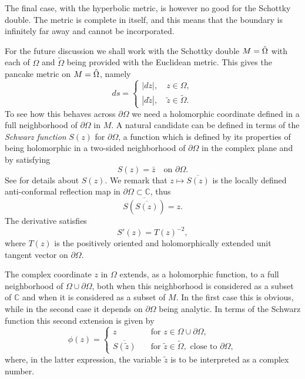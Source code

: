 \documentclass[reqno,12pt]{article}
\theoremstyle{plain}
\theoremstyle{definition}
\numberwithin{equation}{section}
\numberwithin{figure}{section}
\def\C{{\mathbb C}}
\begin{document}
The final case, with the hyperbolic metric, is 
however no good for the Schottky double. The metric is complete in itself, and this means that the boundary is
infinitely far away and cannot be incorporated.

For the future discussion we shall work with the Schottky double 
$M=\Hat{\Omega}$ with each of $\Omega$  and $\tilde{\Omega}$
being provided with the Euclidean metric. This gives the pancake metric on $M=\Hat{\Omega}$, namely
\begin{equation}\label{metricM}
ds=
\begin{cases}
|dz|, \quad z\in \Omega,\\
|d\tilde{z}|, \quad \tilde{z}\in \tilde{\Omega}.
\end{cases}
\end{equation}
To see how this behaves across
$\partial \Omega$ we need a holomorphic coordinate defined in a full neighborhood of $\partial\Omega$ in $M$. 
A natural candidate can be
defined in terms of the {\it Schwarz function} $S(z)$ for $\partial\Omega$, 
a function which is defined by its properties of being holomorphic 
in a two-sided neighborhood of $\partial\Omega$ in the complex plane and by satisfying
\begin{equation}\label{Schwarz}
S(z)=\bar{z} \quad \text{on }\partial\Omega.
\end{equation} 
See \cite{Davis-1974, Shapiro-1992} for details about $S(z)$. We remark that 
$z\mapsto \overline{S(z)}$ is the locally defined anti-conformal reflection map in $\partial\Omega\subset\C$,
thus
\begin{equation}\label{SSz}
\overline{S(\overline{S(z)})}=z.
\end{equation}
The derivative satisfies
\begin{equation}\label{SprimeT}
S'(z)=T(z)^{-2},
\end{equation}
where $T(z)$ is the positively oriented and holomorphically extended unit tangent vector on $\partial\Omega$. 

The complex coordinate $z$ in $\Omega$ extends, as a holomorphic function, to a full neighborhood of $\Omega\cup\partial\Omega$,
both when this neighborhood is considered as a subset of $\C$ and when it is considered as a subset of $M$.
In the first case this is obvious, while in the second case it depends on $\partial\Omega$ being analytic. 
In terms of the Schwarz function this second extension is given by
\begin{equation}\label{extension}
\phi(z)=
\begin{cases}
z\quad &\text{for }z\in\Omega\cup \partial\Omega,\\
\overline{S({\tilde{z}})}\quad&\text{for }\tilde{z}\in \tilde{\Omega},\text{ close to }\partial\Omega,
\end{cases}
\end{equation} 
where, in the latter expression, the variable $\tilde{z}$ is to be interpreted as a complex number.
\end{document}

